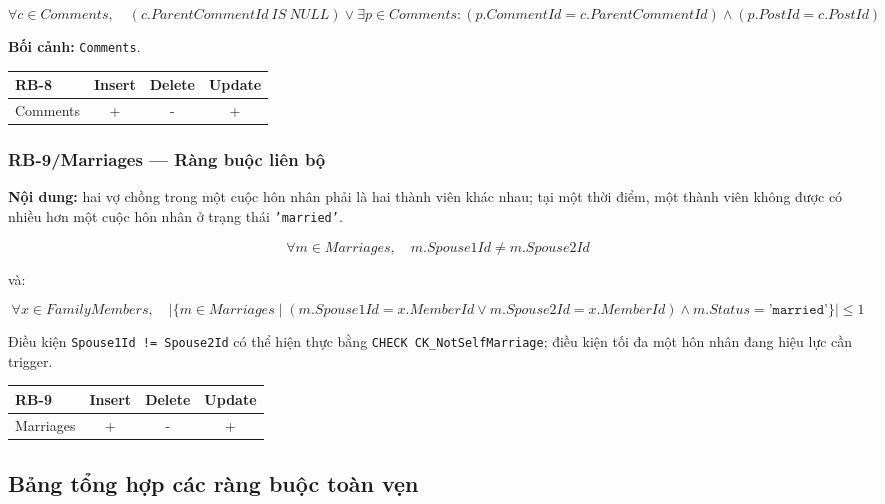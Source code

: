 \[
\forall c\in Comments,\quad
(c.ParentCommentId\ IS\ NULL)
\lor
\exists p\in Comments:
(p.CommentId=c.ParentCommentId)
\land
(p.PostId=c.PostId)
\]

\textbf{Bối cảnh:} \texttt{Comments}.

\begin{center}
\begin{tabular}{@{}lccc@{}}
\toprule
\textbf{RB-8} & \textbf{Insert} & \textbf{Delete} & \textbf{Update}\\
\midrule
Comments & + & - & +\\
\bottomrule
\end{tabular}
\end{center}

\subsubsection*{RB-9/Marriages --- Ràng buộc liên bộ}

\textbf{Nội dung:} hai vợ chồng trong một cuộc hôn nhân phải là hai thành viên khác nhau; tại một thời điểm, một thành viên không được có nhiều hơn một cuộc hôn nhân ở trạng thái \texttt{'married'}.

\[
\forall m\in Marriages,\quad
m.Spouse1Id\ne m.Spouse2Id
\]

và:

\[
\forall x\in FamilyMembers,\quad
\left|
\{m\in Marriages\mid
(m.Spouse1Id=x.MemberId\lor m.Spouse2Id=x.MemberId)
\land m.Status=\texttt{'married'}\}
\right|
\le 1
\]

Điều kiện \texttt{Spouse1Id != Spouse2Id} có thể hiện thực bằng \texttt{CHECK CK\_NotSelfMarriage}; điều kiện tối đa một hôn nhân đang hiệu lực cần trigger.

\begin{center}
\begin{tabular}{@{}lccc@{}}
\toprule
\textbf{RB-9} & \textbf{Insert} & \textbf{Delete} & \textbf{Update}\\
\midrule
Marriages & + & - & +\\
\bottomrule
\end{tabular}
\end{center}

\subsection{Bảng tổng hợp các ràng buộc toàn vẹn}

